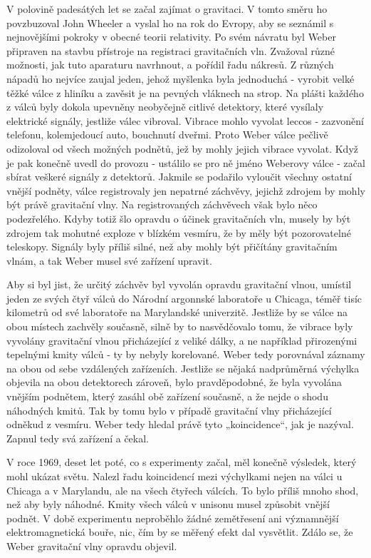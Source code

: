   V polovině padesátých let se začal zajímat o gravitaci. V tomto směru ho povzbuzoval John Wheeler
  a vyslal ho na rok do Evropy, aby se seznámil s nejnovějšími pokroky v obecné teorii relativity.
  Po svém návratu byl Weber připraven na stavbu přístroje na registraci gravitačních vln. Zvažoval
  různé možnosti, jak tuto aparaturu navrhnout, a pořídil řadu nákresů. Z různých nápadů ho nejvíce
  zaujal jeden, jehož myšlenka byla jednoduchá - vyrobit velké těžké válce z hliníku a zavěsit je na
  pevných vláknech na strop. Na plášti každého z válců byly dokola upevněny neobyčejně citlivé
  detektory, které vysílaly elektrické signály, jestliže válec vibroval. Vibrace mohlo vyvolat
  leccos - zazvonění telefonu, kolemjedoucí auto, bouchnutí dveřmi. Proto Weber válce pečlivě
  odizoloval od všech možných podnětů, jež by mohly jejich vibrace vyvolat. Když je pak konečně
  uvedl do provozu - ustálilo se pro ně jméno Weberovy válce - začal sbírat veškeré signály z
  detektorů. Jakmile se podařilo vyloučit všechny ostatní vnější podněty, válce registrovaly jen
  nepatrné záchvěvy, jejichž zdrojem by mohly být právě gravitační vlny. Na registrovaných
  záchvěvech však bylo něco podezřelého. Kdyby totiž šlo opravdu o účinek gravitačních vln, musely
  by být zdrojem tak mohutné exploze v blízkém vesmíru, že by měly být pozorovatelné teleskopy.
  Signály byly příliš silné, než aby mohly být přičítány gravitačním vlnám, a tak Weber musel své
  zařízení upravit. 

  Aby si byl jist, že určitý záchvěv byl vyvolán opravdu gravitační vlnou, umístil jeden ze svých
  čtyř válců do Národní argonnské laboratoře u Chicaga, téměř tisíc kilometrů od své laboratoře na
  Marylandské univerzitě. Jestliže by se válce na obou místech zachvěly současně, silně by to
  nasvědčovalo tomu, že vibrace byly vyvolány gravitační vlnou přicházející z veliké dálky, a ne
  například přirozenými tepelnými kmity válců - ty by nebyly korelované. Weber tedy porovnával
  záznamy na obou od sebe vzdálených zařízeních. Jestliže se nějaká nadprůměrná výchylka objevila na
  obou detektorech zároveň, bylo pravděpodobné, že byla vyvolána vnějším podnětem, který zasáhl obě
  zařízení současně, a že nejde o shodu náhodných kmitů. Tak by tomu bylo v případě gravitační vlny
  přicházející odněkud z vesmíru. Weber tedy hledal právě tyto „koincidence“, jak je nazýval. Zapnul
  tedy svá zařízení a čekal. 

  V roce 1969, deset let poté, co s experimenty začal, měl konečně výsledek, který mohl ukázat
  světu. Nalezl řadu koincidencí mezi výchylkami nejen na válci u Chicaga a v Marylandu, ale na
  všech čtyřech válcích. To bylo příliš mnoho shod, než aby byly náhodné. Kmity všech válců v
  unisonu musel způsobit vnější podnět. V době experimentu neproběhlo žádné zemětřesení ani
  významnější elektromagnetická bouře, nic, čím by se měřený efekt dal vysvětlit. Zdálo se, že Weber
  gravitační vlny opravdu objevil. 

